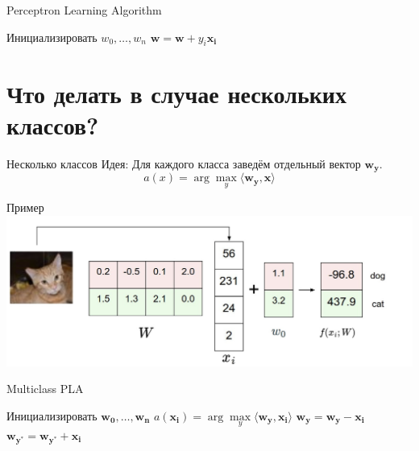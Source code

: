 \documentclass[10pt]{beamer}
\begin{document}
\begin{frame}{Perceptron Learning Algorithm}
	\begin{algorithmic}[1]
            \State Инициализировать ${w_0, \dots, w_n}$
                   \State $\mathbf{w} = \mathbf{w} + y_i \mathbf{x_i}$
                 \EndIf  
               \EndFor
           	\EndRepeat
        \EndFunction
    \end{algorithmic}
\end{frame}

\section{Что делать в случае нескольких классов?}

\begin{frame} {Несколько классов}
  \alert{Идея}: Для каждого класса заведём отдельный вектор $\mathbf{w_y}$.
  \bigbreak \pause
  $$a(x) = \arg\max\limits_{y} \langle \mathbf{w_y}, \mathbf{x} \rangle $$
\end{frame}

\begin{frame}{Пример}
  \centering
  \includegraphics[width=\textwidth, keepaspectratio]{images/catimagemap}
\end{frame}

\begin{frame}{Multiclass PLA}
	\begin{algorithmic}[1]
            \State Инициализировать ${\mathbf{w_0}, \dots, \mathbf{w_n}}$
                 \State $a(\mathbf{x_i}) = \arg\max\limits_{y} \langle \mathbf{w_y}, \mathbf{x_i} \rangle $                 
                   \State $\mathbf{w_y} = \mathbf{w_y} - \mathbf{x_i}$
                   \State $\mathbf{w_{y^{*}}} = \mathbf{w_{y^{*}}} + \mathbf{x_i}$
                 \EndIf  
               \EndFor
           	\EndRepeat
        \EndFunction
    \end{algorithmic}
\end{frame}
\end{document}

